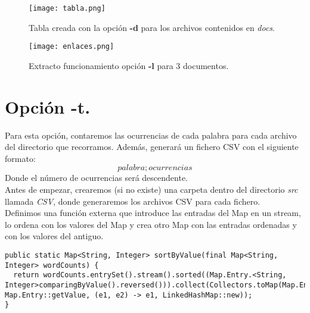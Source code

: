 \documentclass[12pt]{article}
\begin{document}
\begin{figure}[h]
\centering
\texttt{[image: tabla.png]}
\label{tabla}
\caption{Tabla creada con la opción \textbf{-d} para los archivos contenidos en \textit{docs}.}
\end{figure}

\begin{figure}[h]
\centering
\texttt{[image: enlaces.png]}
\label{enlace}
\caption{Extracto funcionamiento opción \textbf{-l} para 3 documentos.}
\end{figure}

\clearpage

\section{Opción \textbf{-t}.}

Para esta opción, contaremos las ocurrencias de cada palabra para cada archivo del directorio que recorramos. Además, generará un fichero CSV con el siguiente formato: $$palabra ; ocurrencias$$
Donde el número de ocurrencias será descendente.\\

Antes de empezar, crearemos (si no existe) una carpeta dentro del directorio \textit{src} llamada \textit{CSV}, donde generaremos los archivos CSV para cada fichero.\\

Definimos una función externa que introduce las entradas del Map en un stream, lo ordena con los valores del Map y crea otro Map con las entradas ordenadas y con los valores del antiguo.\\
  
\begin{lstlisting}
public static Map<String, Integer> sortByValue(final Map<String, Integer> wordCounts) {
  return wordCounts.entrySet().stream().sorted((Map.Entry.<String, Integer>comparingByValue().reversed())).collect(Collectors.toMap(Map.Entry::getKey, Map.Entry::getValue, (e1, e2) -> e1, LinkedHashMap::new));
}
\end{lstlisting}
\end{document}
